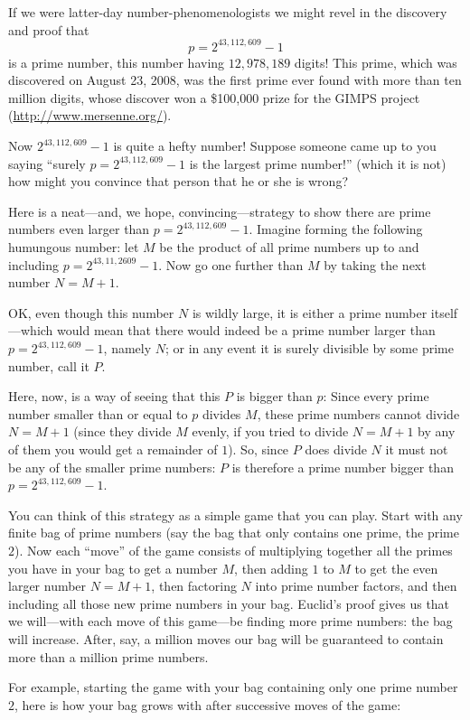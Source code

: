 \documentclass[11pt,draft]{article}
\theoremstyle{plain}
\theoremstyle{definition}
\numberwithin{equation}{section}
\numberwithin{figure}{section}
\numberwithin{table}{section}
\begin{document}
If we were latter-day number-phenomenologists we might revel in the
discovery and proof that
$$
  p=2^{43,112,609}-1
$$ 
is a prime number, this number having $12,\!978,\!189$ digits!  This
prime, which was discovered on August 23, 2008, was the first prime
ever found with more than ten million digits, whose discover won a
\$100,000 prize for the GIMPS project (\url{http://www.mersenne.org/}).

Now $2^{43,112,609}-1$ is quite a hefty number! Suppose someone came
up to you saying ``surely $p = 2^{43,112,609}-1$ is the largest prime
number!'' (which it is not) how might you convince that person that
he or she is wrong?

Here is a neat---and, we hope, convincing---strategy to show there are
prime numbers even larger than $p = 2^{43,112,609} - 1$. Imagine
forming the following humungous number: let $M$ be the product of all
prime numbers up to and including $p = 2^{43,11,2609} - 1$.  Now go
one further than $M$ by taking the next number $N=M+1$.
 

OK, even though this number $N$ is wildly large, it is either a prime
number itself---which would mean that there would indeed be a prime
number larger than $p=2^{43,112,609} - 1$, namely $N$; or in any event it is
surely divisible by some prime number, call it $P$.

Here, now, is a way of seeing that this $P$ is bigger than $p$: Since
every prime number smaller than or equal to $p$ divides $M$, these
prime numbers cannot divide $N= M+1$ (since they divide $M$ evenly, if
you tried to divide $N=M+1$ by any of them you would get a remainder
of $1$).  So, since $P$ does divide $N$ it must not be any of the
smaller prime numbers: $P$ is therefore a prime number bigger than $p=
2^{43,112,609}-1$.

You can think of this strategy as a simple game that you can
play. Start with any finite bag of prime numbers (say the bag that
only contains one prime, the prime $2$). Now each ``move'' of the game
consists of multiplying together all the primes you have in your bag
to get a number $M$, then adding $1$ to $M$ to get the even larger
number $N=M+1$, then factoring $N$ into prime number factors, and then
including all those new prime numbers in your bag. Euclid's proof
gives us that we will---with each move of this game---be finding more
prime numbers: the bag will increase. After, say, a million moves our
bag will be guaranteed to contain more than a million prime numbers.

For example, starting the game with your bag containing
only one prime number $2$, here is how your bag grows with after
successive moves of the game:
\end{document}
